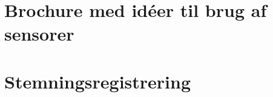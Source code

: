 %
\printbibliography[heading=bibintoc]

\appendix



\chapter{Brochure med idéer til brug af sensorer}\label{app:brochure}
 

\chapter{Stemningsregistrering}\label{app:stemningsregistrering}




